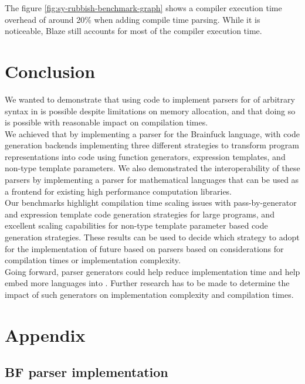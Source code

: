 \documentclass[../../main.tex]{subfiles}
\begin{document}
The figure \ref{fig:sy-rubbish-benchmark-graph} shows a compiler execution time
overhead of around 20\% when adding compile time parsing.
While it is noticeable, Blaze still accounts for most of the compiler execution
time.

\section{Conclusion}

We wanted to demonstrate that using \constexpr code to implement parsers for
\dsel of arbitrary syntax in  is possible despite limitations on
\constexpr memory allocation, and that doing so is possible with reasonable
impact on compilation times.\\

We achieved that by implementing a \constexpr parser for the Brainfuck language,
with code generation backends implementing three different strategies to
transform \constexpr program representations into code using function
generators, expression templates, and non-type template parameters.
We also demonstrated the interoperability of these \constexpr parsers by
implementing a parser for mathematical languages that can be used as a frontend
for existing high performance \cpp computation libraries.\\

Our benchmarks highlight compilation time scaling issues with pass-by-generator
and expression template code generation strategies for large programs, and
excellent scaling capabilities for non-type template parameter based code
generation strategies. These results can be used to decide which strategy to
adopt for the implementation of future \dsel based on \constexpr parsers
based on considerations for compilation times or implementation complexity.\\

Going forward, \constexpr parser generators could help reduce
\dsel implementation time and help embed more languages into .
Further research has to be made to determine the impact of such generators on
\dsel implementation complexity and compilation times.


\appendix
\section{Appendix}

\subsection{BF parser implementation}\label{app:bf-parser}


\end{document}
